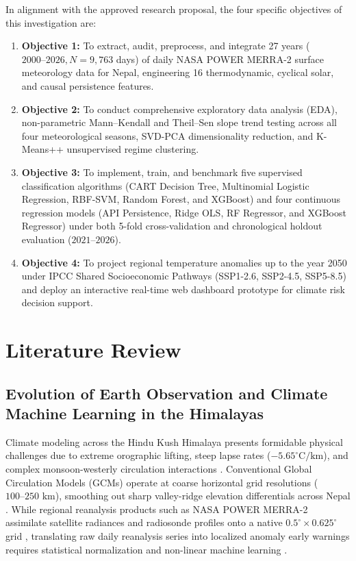 \documentclass[conference]{IEEEtran}
\begin{document}
In alignment with the approved research proposal, the four specific objectives of this investigation are:
\begin{enumerate}
    \item \textbf{Objective 1:} To extract, audit, preprocess, and integrate 27 years ($2000\text{--}2026, N = 9,763$ days) of daily NASA POWER MERRA-2 surface meteorology data for Nepal, engineering 16 thermodynamic, cyclical solar, and causal persistence features.
    \item \textbf{Objective 2:} To conduct comprehensive exploratory data analysis (EDA), non-parametric Mann--Kendall and Theil--Sen slope trend testing across all four meteorological seasons, SVD-PCA dimensionality reduction, and K-Means++ unsupervised regime clustering.
    \item \textbf{Objective 3:} To implement, train, and benchmark five supervised classification algorithms (CART Decision Tree, Multinomial Logistic Regression, RBF-SVM, Random Forest, and XGBoost) and four continuous regression models (API Persistence, Ridge OLS, RF Regressor, and XGBoost Regressor) under both 5-fold cross-validation and chronological holdout evaluation ($2021\text{--}2026$).
    \item \textbf{Objective 4:} To project regional temperature anomalies up to the year 2050 under IPCC Shared Socioeconomic Pathways (SSP1-2.6, SSP2-4.5, SSP5-8.5) and deploy an interactive real-time web dashboard prototype for climate risk decision support.
\end{enumerate}

\section{Literature Review}

\subsection{Evolution of Earth Observation and Climate Machine Learning in the Himalayas}
Climate modeling across the Hindu Kush Himalaya presents formidable physical challenges due to extreme orographic lifting, steep lapse rates ($-5.65^\circ\text{C/km}$), and complex monsoon-westerly circulation interactions \cite{shrestha2015, karmacharya2021}. Conventional Global Circulation Models (GCMs) operate at coarse horizontal grid resolutions ($100\text{--}250\text{ km}$), smoothing out sharp valley-ridge elevation differentials across Nepal \cite{karmacharya2021, sharma2023}. While regional reanalysis products such as NASA POWER MERRA-2 assimilate satellite radiances and radiosonde profiles onto a native $0.5^\circ \times 0.625^\circ$ grid \cite{nasa2026, nepal2025}, translating raw daily reanalysis series into localized anomaly early warnings requires statistical normalization and non-linear machine learning \cite{hastie2009, breiman2001}.
\end{document}
